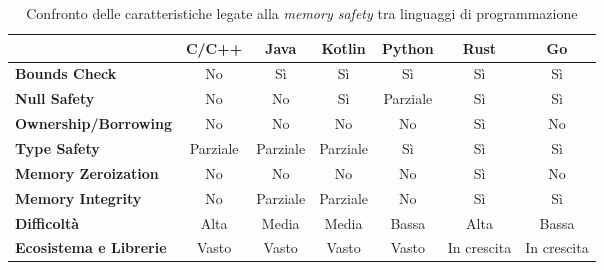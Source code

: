 
\small
\setlength{\tabcolsep}{4pt}
\begin{table}[H]
  \centering
  \begin{tabular}{l|c|c|c|c|c|c|}
    \multicolumn{1}{l}{}                      & \textbf{C/C++}                & \textbf{Java}                 & \textbf{Kotlin}               & \textbf{Python}               & \textbf{Rust}                       & \textbf{Go}                      \\
    \hline
    \textbf{Bounds Check}                     & \cellcolor{red!20}No          & \cellcolor{green!20}Sì        & \cellcolor{green!20}Sì        & \cellcolor{green!20}Sì        & \cellcolor{green!20}Sì              & \cellcolor{green!20}Sì           \\
    \textbf{Null Safety}                      & \cellcolor{red!20}No          & \cellcolor{red!20}No          & \cellcolor{green!20}Sì        & \cellcolor{yellow!20}Parziale & \cellcolor{green!20}Sì              & \cellcolor{green!20}Sì           \\
    \textbf{Ownership/Borrowing}              & \cellcolor{red!20}No          & \cellcolor{red!20}No          & \cellcolor{red!20}No          & \cellcolor{red!20}No          & \cellcolor{green!20}Sì              & \cellcolor{red!20}No             \\
    \textbf{Type Safety}                      & \cellcolor{yellow!20}Parziale & \cellcolor{yellow!20}Parziale & \cellcolor{yellow!20}Parziale & \cellcolor{green!20}Sì        & \cellcolor{green!20}Sì              & \cellcolor{green!20}Sì           \\
    \textbf{Memory Zeroization}               & \cellcolor{red!20}No          & \cellcolor{red!20}No          & \cellcolor{red!20}No          & \cellcolor{red!20}No          & \cellcolor{green!20}Sì\footnotemark & \cellcolor{red!20}No             \\
    \textbf{Memory Integrity}                 & \cellcolor{red!20}No          & \cellcolor{yellow!20}Parziale & \cellcolor{yellow!20}Parziale & \cellcolor{red!20}No          & \cellcolor{green!20}Sì              & \cellcolor{green!20}Sì           \\
    \hline
    \textbf{Difficoltà}\cite{learning_curves} & \cellcolor{red!20}Alta        & \cellcolor{yellow!20}Media    & \cellcolor{yellow!20}Media    & \cellcolor{green!20}Bassa     & \cellcolor{red!20}Alta              & \cellcolor{green!20}Bassa        \\
    \textbf{Ecosistema e Librerie}            & \cellcolor{green!20}Vasto     & \cellcolor{green!20}Vasto     & \cellcolor{green!20}Vasto     & \cellcolor{green!20}Vasto     & \cellcolor{yellow!20}In crescita    & \cellcolor{yellow!20}In crescita \\
    \hline
  \end{tabular}
  \caption{Confronto delle caratteristiche legate alla \textit{memory safety} tra
  linguaggi di programmazione}
  \label{tab:linguaggi_memory_safety}
\end{table}

